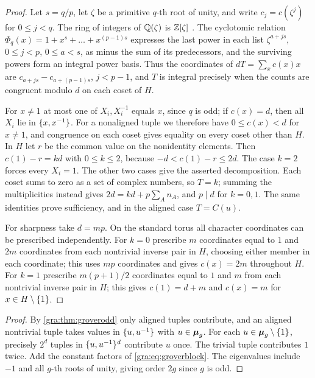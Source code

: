 \begin{proof}
Let $s=q/p$, let $\zeta$ be a primitive $q$-th root of unity, and write $c_j=c(\zeta^j)$
for $0\le j<q$. The ring of integers of $\mathbb{Q}(\zeta)$ is $\mathbb{Z}[\zeta]$
\cite[Chapter~2]{Washington1997Introduction}. The cyclotomic relation
$\Phi_q(x)=1+x^s+\dots+x^{(p-1)s}$ expresses the last power in each list $\zeta^{a+js}$,
$0\le j<p$, $0\le a<s$, as minus the sum of its predecessors, and the surviving powers
form an integral power basis. Thus the coordinates of $dT=\sum_xc(x)x$ are
$c_{a+js}-c_{a+(p-1)s}$, $j<p-1$, and $T$ is integral precisely when the counts are
congruent modulo $d$ on each coset of $H$.

For $x\ne1$ at most one of $X_i,X_i^{-1}$ equals $x$, since $q$ is odd; if $c(x)=d$, then
all $X_i$ lie in $\{x,x^{-1}\}$. For a nonaligned tuple we therefore have $0\le c(x)<d$
for $x\ne1$, and congruence on each coset gives equality on every coset other than $H$. In
$H$ let $r$ be the common value on the nonidentity elements. Then $c(1)-r=kd$ with
$0\le k\le2$, because $-d<c(1)-r\le2d$. The case $k=2$ forces every $X_i=1$. The other two
cases give the asserted decomposition. Each coset sums to zero as a set of complex
numbers, so $T=k$; summing the multiplicities instead gives $2d=kd+p\sum_An_A$, and
$p\mid d$ for $k=0,1$. The same identities prove sufficiency, and in the aligned case
$T=C(u)$.

For sharpness take $d=mp$. On the standard torus all character coordinates can be
prescribed independently. For $k=0$ prescribe $m$ coordinates equal to $1$ and $2m$
coordinates from each nontrivial inverse pair in $H$, choosing either member in each
coordinate; this uses $mp$ coordinates and gives $c(x)=2m$ throughout $H$. For $k=1$
prescribe $m(p+1)/2$ coordinates equal to $1$ and $m$ from each nontrivial inverse pair in
$H$; this gives $c(1)=d+m$ and $c(x)=m$ for $x\in H\setminus\{1\}$.
\end{proof}


\begin{proof}
By \cref{gra:thm:groverodd} only aligned tuples contribute, and an aligned nontrivial tuple
takes values in $\{u,u^{-1}\}$ with $u\in\boldsymbol{\mu}_g$. For each $u\in\boldsymbol{\mu}_g\setminus\{1\}$,
precisely $2^d$ tuples in $\{u,u^{-1}\}^d$ contribute $u$ once. The trivial tuple
contributes $1$ twice. Add the constant factors of \eqref{gra:eq:groverblock}. The
eigenvalues include $-1$ and all $g$-th roots of unity, giving order $2g$ since $g$ is odd.
\end{proof}

